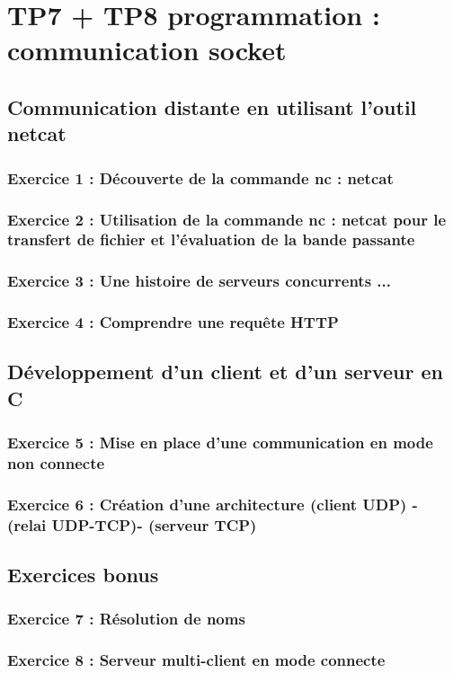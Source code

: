 \chapter{TP7 + TP8 programmation : communication socket}
    \section{Communication distante en utilisant l’outil netcat}
        \subsection{Exercice 1 : Découverte de la commande nc : netcat}
        \subsection{Exercice 2 : Utilisation de la commande nc : netcat pour le transfert de fichier et l’évaluation de
la bande passante}
        \subsection{Exercice 3 : Une histoire de serveurs concurrents ...}
        \subsection{Exercice 4 : Comprendre une requête HTTP}
    \section{Développement d’un client et d’un serveur en C}
        \subsection{Exercice 5 : Mise en place d’une communication en mode non connecte}
        \subsection{Exercice 6 : Création d’une architecture (client UDP) - (relai UDP-TCP)- (serveur TCP)}
    \section{Exercices bonus}
        \subsection{Exercice 7 : Résolution de noms}
        \subsection{Exercice 8 : Serveur multi-client en mode connecte}
